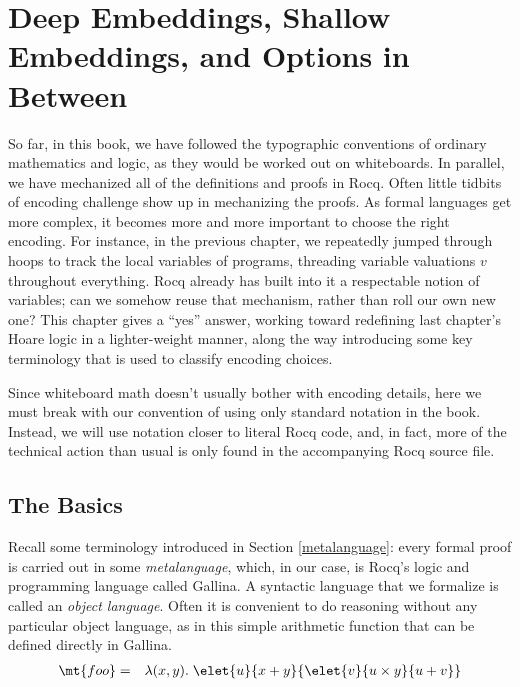 \documentclass{amsbook}
\theoremstyle{definition}
\theoremstyle{remark}
\numberwithin{section}{chapter}
\numberwithin{equation}{chapter}
\begin{document}
\chapter{Deep Embeddings, Shallow Embeddings, and Options in Between}
\label{embeddings}

So far, in this book, we have followed the typographic conventions of ordinary mathematics and logic, as they would be worked out on whiteboards.
In parallel, we have mechanized all of the definitions and proofs in Rocq.
Often little tidbits of encoding challenge show up in mechanizing the proofs.
As formal languages get more complex, it becomes more and more important to choose the right encoding.
For instance, in the previous chapter, we repeatedly jumped through hoops to track the local variables of programs, threading variable valuations $v$ throughout everything.
Rocq already has built into it a respectable notion of variables; can we somehow reuse that mechanism, rather than roll our own new one?
This chapter gives a ``yes'' answer, working toward redefining last chapter's Hoare logic in a lighter-weight manner, along the way introducing some key terminology that is used to classify encoding choices.

Since whiteboard math doesn't usually bother with encoding details, here we must break with our convention of using only standard notation in the book.
Instead, we will use notation closer to literal Rocq code, and, in fact, more of the technical action than usual is only found in the accompanying Rocq source file.

\section{The Basics}\label{mixed}

Recall some terminology introduced in Section \ref{metalanguage}: every formal proof is carried out in some \emph{metalanguage}, which, in our case, is Rocq's logic and programming language called Gallina.
A syntactic language that we formalize is called an \emph{object language}.
Often it is convenient to do reasoning without any particular object language, as in this simple arithmetic function that can be defined directly in Gallina.
\begin{eqnarray*}
  \mt{foo} &=& \lambda(x, y). \; \elet{u}{x + y}{\elet{v}{u \times y}{u + v}}
\end{eqnarray*}
\end{document}

